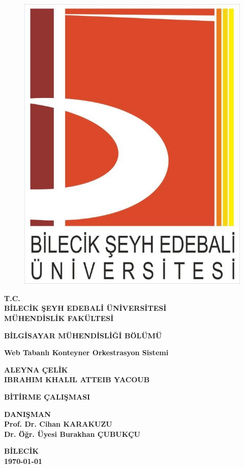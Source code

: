 \thispagestyle{empty}
\begin{figure}[H]
\centering
\includegraphics[scale=0.2]{logomuz}
\end{figure}

\begin{center}
\textbf{T.C.}\\
\textbf{BİLECİK ŞEYH EDEBALİ ÜNİVERSİTESİ}\\
\textbf{MÜHENDİSLİK FAKÜLTESİ}

\textbf{BİLGİSAYAR MÜHENDİSLİĞİ BÖLÜMÜ}
\end{center}
\vfill
\begin{center}
\textbf{Web Tabanlı Konteyner Orkestrasyon Sistemi }

\textbf{ALEYNA ÇELİK \\ IBRAHIM KHALIL ATTEIB YACOUB}

\textbf{BİTİRME ÇALIŞMASI}
\end{center}
\vfill
\begin{center}
\textbf{DANIŞMAN  \\ Prof. Dr. Cihan KARAKUZU \\ Dr. Öğr. Üyesi Burakhan ÇUBUKÇU}

\textbf{BİLECİK}\\ 
\textbf{\today}
\end{center}

